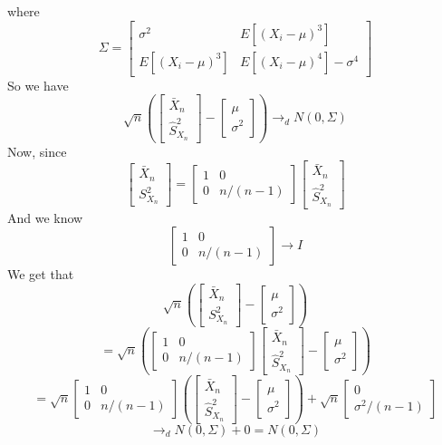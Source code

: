 \documentclass[10pt,letter]{article}
\begin{document}
\begin{enumerate}[label=(\alph*)]
where
\[ \Sigma = \begin{bmatrix} \sigma^2 & E[(X_i - \mu)^3] \\ E[(X_i - \mu)^3] & E[(X_i - \mu)^4] - \sigma^4 \end{bmatrix}   \]
So we have
\[\sqrt{n} \left( \begin{bmatrix}\bar{X}_n\\ \hat{S}^2_{X_n}\end{bmatrix} - \begin{bmatrix} \mu \\ \sigma^2 \end{bmatrix}\right) \to_d N(0, \Sigma) \]
Now, since
\[\begin{bmatrix}\bar{X}_n\\ S^2_{X_n}\end{bmatrix}  = \begin{bmatrix}1 & 0 \\ 0 & n/(n-1) \end{bmatrix} \begin{bmatrix}\bar{X}_n\\ \hat{S}^2_{X_n}\end{bmatrix}\]
And we know
\[\begin{bmatrix}1 & 0 \\ 0 & n/(n-1) \end{bmatrix} \to I \]
We get that
\[ \sqrt{n} \left( \begin{bmatrix}\bar{X}_n\\ S^2_{X_n}\end{bmatrix} - \begin{bmatrix} \mu \\ \sigma^2 \end{bmatrix}\right) \]
\[ = \sqrt{n} \left( \begin{bmatrix}1 & 0 \\ 0 & n/(n-1) \end{bmatrix} \begin{bmatrix}\bar{X}_n\\ \hat{S}^2_{X_n}\end{bmatrix} - \begin{bmatrix} \mu \\ \sigma^2 \end{bmatrix}\right)  \]
\[ = \sqrt{n}\begin{bmatrix}1 & 0 \\ 0 & n/(n-1) \end{bmatrix}  \left( \begin{bmatrix}\bar{X}_n\\ \hat{S}^2_{X_n}\end{bmatrix} - \begin{bmatrix} \mu \\ \sigma^2 \end{bmatrix}\right) + \sqrt{n} \begin{bmatrix} 0 \\ \sigma^2 /(n-1)\end{bmatrix} \] \[\to_d N(0, \Sigma) + 0 = N(0,\Sigma) \]

\end{enumerate}
\end{document}
